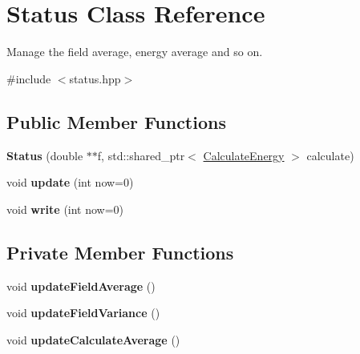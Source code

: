 \hypertarget{class_status}{}\section{Status Class Reference}
\label{class_status}


Manage the field average, energy average and so on.  




{\ttfamily \#include $<$status.\+hpp$>$}

\subsection*{Public Member Functions}
\begin{DoxyCompactItemize}
\item 
\mbox{\label{class_status_a8dc65ba0ef771a3f7e4e612428fad036}} 
{\bfseries Status} (double $\ast$$\ast$f, std\+::shared\+\_\+ptr$<$ \mbox{\hyperlink{class_calculate_energy}{Calculate\+Energy}} $>$ calculate)
\item 
\mbox{\label{class_status_aee5635f7aba23798c42460d8b1e223bb}} 
void {\bfseries update} (int now=0)
\item 
\mbox{\label{class_status_acae978a23f1af0761ab95b6ad7fd376a}} 
void {\bfseries write} (int now=0)
\end{DoxyCompactItemize}
\subsection*{Private Member Functions}
\begin{DoxyCompactItemize}
\item 
\mbox{\label{class_status_a07b8fac037e56b2359e390bca99a9b6a}} 
void {\bfseries update\+Field\+Average} ()
\item 
\mbox{\label{class_status_a7380d900d7af2cbe3eeffa4350e05534}} 
void {\bfseries update\+Field\+Variance} ()
\item 
\mbox{\label{class_status_a78fce4aa8bf9d9b035fa41755f6dba47}} 
void {\bfseries update\+Calculate\+Average} ()
\end{DoxyCompactItemize}
